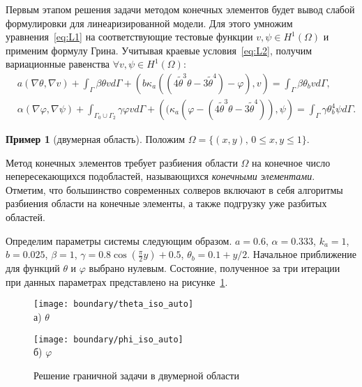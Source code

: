 Первым этапом решения задачи методом конечных элементов будет вывод слабой формулировки для
линеаризированной модели.
Для этого умножим уравнения~\eqref{eq:L1} на соответствующие тестовые функции
$v, \psi \in H^1(\Omega)$ и применим формулу Грина.
Учитывая краевые условия~\eqref{eq:L2},
получим вариационные равенства $\forall v, \psi \in H^1(\Omega)$:
\begin{equation*}
    \begin{aligned}
        & a( \nabla \theta, \nabla v ) + \int_\Gamma \beta \theta v d\Gamma
        + \left(b \kappa_a (\left(4 \widetilde{\theta}^{3}
        \theta-3 \widetilde{\theta}^{4}\right) - \varphi ), v\right)
        = \int_\Gamma \beta \theta_b v d\Gamma,
        \\
        & \alpha (\nabla \varphi,\nabla \psi)
        + \int_{\Gamma_0 \cup \Gamma_2} \gamma \varphi v d\Gamma
        + \left( (\kappa_a (\varphi - \left(4 \widetilde{\theta}^{3}
        \theta-3 \widetilde{\theta}^{4}\right)), \psi\right)
        = \int_{\Gamma} \gamma \theta_b^4 \psi d\Gamma.
    \end{aligned}
\end{equation*}

\textbf{Пример 1} (двумерная область).
Положим $\Omega=\{(x,y),\, 0 \leq x,y \leq 1 \}$.

Метод конечных элементов требует разбиения области $\Omega$ на
конечное число непересекающихся подобластей, называющихся
\textit{конечными элементами}.
Отметим, что большинство современных солверов включают в себя
алгоритмы разбиения области на конечные элементы, а также подгрузку
уже разбитых областей.

Определим параметры системы следующим образом.
$a = 0.6$,
$\alpha = 0.333$,
$k_a = 1$,
$b = 0.025$,
$\beta = 1$,
$\gamma = 0.8 \cos\left(\frac{\pi}{2} y\right) + 0.5$,
$\theta_b = 0.1 + y / 2$.
Начальное приближение для функций $\theta$ и $\varphi$ выбрано нулевым.
Состояние, полученное за три итерации при данных параметрах представлено
на рисунке~\ref{fig:4_1:boundary}.
\begin{figure}[h!t]
    \begin{minipage}[b][][b]{0.49\linewidth}
        \centering
        \texttt{[image: boundary/theta\_iso\_auto]} \\ а) $\theta$
    \end{minipage}
    \hfill
    \begin{minipage}[b][][b]{0.49\linewidth}
        \centering
        \texttt{[image: boundary/phi\_iso\_auto]} \\ б) $\varphi$
    \end{minipage}
    \caption{Решение граничной задачи в двумерной области}
    \label{fig:4_1:boundary}
\end{figure}


